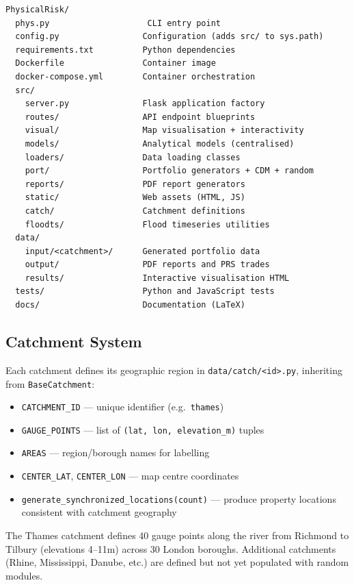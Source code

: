 \documentclass[11pt,a4paper]{article}
\begin{document}
\begin{lstlisting}[language={},caption={Project directory layout}]
PhysicalRisk/
  phys.py                    CLI entry point
  config.py                 Configuration (adds src/ to sys.path)
  requirements.txt          Python dependencies
  Dockerfile                Container image
  docker-compose.yml        Container orchestration
  src/
    server.py               Flask application factory
    routes/                 API endpoint blueprints
    visual/                 Map visualisation + interactivity
    models/                 Analytical models (centralised)
    loaders/                Data loading classes
    port/                   Portfolio generators + CDM + random
    reports/                PDF report generators
    static/                 Web assets (HTML, JS)
    catch/                  Catchment definitions
    floodts/                Flood timeseries utilities
  data/
    input/<catchment>/      Generated portfolio data
    output/                 PDF reports and PRS trades
    results/                Interactive visualisation HTML
  tests/                    Python and JavaScript tests
  docs/                     Documentation (LaTeX)
\end{lstlisting}

\subsection{Catchment System}

Each catchment defines its geographic region in \texttt{data/catch/<id>.py},
inheriting from \texttt{BaseCatchment}:

\begin{itemize}[nosep]
    \item \texttt{CATCHMENT\_ID} --- unique identifier (e.g.\ \texttt{thames})
    \item \texttt{GAUGE\_POINTS} --- list of \texttt{(lat, lon, elevation\_m)} tuples
    \item \texttt{AREAS} --- region/borough names for labelling
    \item \texttt{CENTER\_LAT}, \texttt{CENTER\_LON} --- map centre coordinates
    \item \texttt{generate\_synchronized\_locations(count)} --- produce property
          locations consistent with catchment geography
\end{itemize}

The Thames catchment defines 40 gauge points along the river from Richmond to
Tilbury (elevations 4--11m) across 30 London boroughs. Additional catchments
(Rhine, Mississippi, Danube, etc.) are defined but not yet populated with
random modules.
\end{document}
